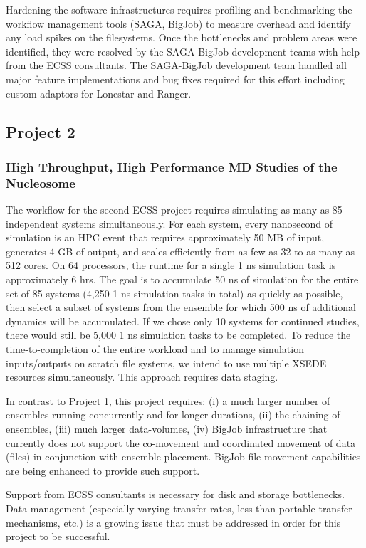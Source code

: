 \documentclass{sig-alternate}
\begin{document}
Hardening the software infrastructures requires profiling and benchmarking the
workflow management tools (SAGA, BigJob) to measure overhead and identify any
load spikes on the filesystems. Once the bottlenecks and problem areas were
identified, they were resolved by the SAGA-BigJob
development teams with help from
the ECSS consultants. The SAGA-BigJob development team handled all major feature
implementations and bug fixes required for this effort including custom
adaptors for Lonestar and Ranger. 

\subsection{Project 2}
\subsubsection*{High Throughput, High Performance MD Studies of the
  Nucleosome}

The workflow for the second ECSS project requires simulating as many as 85
independent systems simultaneously. For each system, every nanosecond of
simulation is an HPC event that requires approximately 50 MB of input, generates
4 GB of output, and scales efficiently from as few as 32 to as many as 512 cores.
On 64 processors, the runtime for a single 1 ns simulation task is approximately
6 hrs. The goal is to accumulate 50 ns of simulation for the entire set of 85
systems (4,250 1 ns simulation tasks in total) as quickly as possible, then
select a subset of systems from the ensemble for which 500 ns of additional
dynamics will be accumulated. If we chose only 10 systems for continued studies,
there would still be 5,000 1 ns simulation tasks to be completed. To reduce the
time-to-completion of the entire workload and to manage simulation
inputs/outputs on scratch file systems, we intend to use multiple XSEDE
resources simultaneously. This approach requires data staging.

In contrast to Project 1, this project requires: 
(i) a much larger number of ensembles
running concurrently and for longer durations, (ii) the chaining of
ensembles, (iii) much larger data-volumes, (iv) BigJob infrastructure that currently does not support the
co-movement and coordinated movement of data (files) in conjunction
with ensemble placement. BigJob file movement capabilities are being
enhanced to provide such support.

Support from ECSS consultants is necessary for disk
and storage bottlenecks. Data management (especially varying transfer rates,
less-than-portable transfer mechanisms, etc.) is a growing issue that must be 
addressed in order for this project to be successful.
\end{document}
